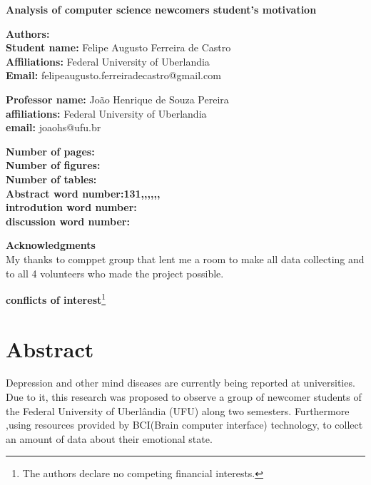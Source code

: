 \documentclass[12pt,openright,a4paper]{article}
\begin{document}
	\linespread{1.5}
 \fontsize{16}{10}\selectfont \centering \textbf{Analysis of computer science newcomers student's motivation} \\
	\fontsize{14}{10}\selectfont {Analysis of student's motivation}\newline

\fontsize{12}{10}
\flushleft
	\textbf{Authors:}\\
	\textbf{Student name:} Felipe Augusto Ferreira de Castro\\
	\textbf{Affiliations:} Federal University of Uberlandia\\
	\textbf{Email:} felipeaugusto.ferreiradecastro@gmail.com \newline
	
\textbf{Professor name:} João Henrique de Souza Pereira\\
\textbf{affiliations:} Federal University of Uberlandia\\
\textbf{email:} joaohs@ufu.br\newline

\textbf{Number of pages:}\\
\textbf{Number of figures:}\\
\textbf{Number of tables:}\\
\textbf{Abstract word number:131,,,,,,}\\
\textbf{introdution word number:}\\
\textbf{discussion word number:}\newline
	
\textbf{Acknowledgments}\\	
My thanks to comppet group that lent me a room to make all data collecting and to all 4 volunteers who made the project possible.\newline

\textbf{conflicts of interest}\footnote{The authors declare no competing financial interests.}

\newpage
\tableofcontents
\newpage
\section{Abstract}
Depression and other mind diseases are currently being reported at universities. Due to it, this research was proposed to observe a group of newcomer students of the Federal University of Uberlândia (UFU) along two semesters. Furthermore ,using resources provided by BCI(Brain computer interface)  technology, to collect an amount of data about their emotional state.
\end{document}
